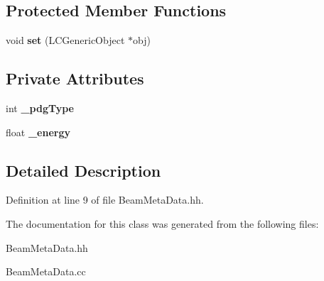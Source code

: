 \subsection*{Protected Member Functions}
\begin{DoxyCompactItemize}
\item 
void {\bfseries set} (L\-C\-Generic\-Object $\ast$obj)\label{classCALICE_1_1BeamMetaData_a70518a4d2e7e10c1e476dccd9cf82b4f}

\end{DoxyCompactItemize}
\subsection*{Private Attributes}
\begin{DoxyCompactItemize}
\item 
int {\bfseries \-\_\-pdg\-Type}\label{classCALICE_1_1BeamMetaData_a1e3ee81446b50e78dbc12b16b8aac6ee}

\item 
float {\bfseries \-\_\-energy}\label{classCALICE_1_1BeamMetaData_ad92f231b44646ed3931c6fbcb02f65aa}

\end{DoxyCompactItemize}


\subsection{Detailed Description}


Definition at line 9 of file Beam\-Meta\-Data.\-hh.



The documentation for this class was generated from the following files\-:\begin{DoxyCompactItemize}
\item 
Beam\-Meta\-Data.\-hh\item 
Beam\-Meta\-Data.\-cc\end{DoxyCompactItemize}
